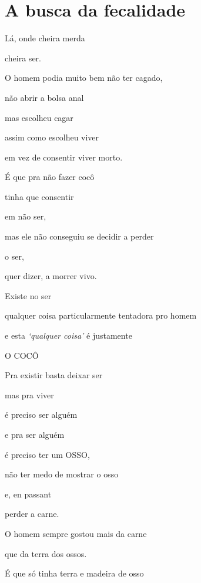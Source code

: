 
\chapter{A busca da fecalidade}



Lá, onde cheira merda

cheira ser.

O homem podia muito bem não ter cagado,

não abrir a bolsa anal

mas escolheu cagar

assim como escolheu viver

em vez de consentir viver morto.

É que pra não fazer cocô

tinha que consentir

em não ser, 

mas ele não conseguiu se decidir a perder

o ser,

quer dizer, a morrer vivo.

Existe no ser

qualquer coisa particularmente tentadora pro homem

e esta \emph{`qualquer coisa'} é justamente

O COCÔ


Pra existir basta deixar ser

mas pra viver

é preciso ser alguém

e pra ser alguém

é preciso ter um OSSO, 

não ter medo de mostrar o osso

e, en passant

perder a carne.


O homem sempre gostou mais da carne

que da terra dos ossos. 

É que só tinha terra e madeira de osso

